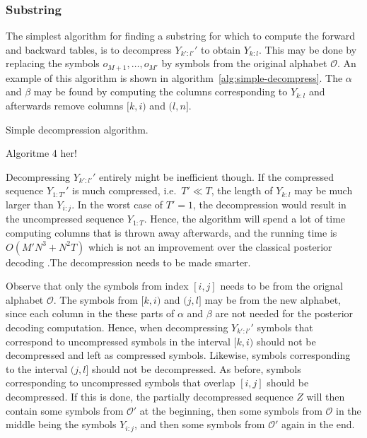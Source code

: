 \subsubsection{Substring}

The simplest algorithm for finding a substring for which to compute the forward
and backward tables, is to decompress $Y_{k':l'}'$ to obtain $Y_{k:l}$. This
may be done by replacing the symbols $o_{M + 1}, \dots, o_{M'}$ by symbols from
the original alphabet $\mathcal{O}$. An example of this algorithm is shown in
algorithm~\ref{alg:simple-decompress}. The $\alpha$ and $\beta$ may be found by
computing the columns corresponding to $Y_{k:l}$ and afterwards remove columns
$[k, i)$ and $(l, n]$.

\begin{algorithm}
  \caption{Simple decompression algorithm.}
  \label{alg:simple-decompress}
  Algoritme 4 her!
\end{algorithm}

Decompressing $Y_{k':l'}'$ entirely might be inefficient though. If the
compressed sequence $Y_{1:T'}'$ is much compressed, i.e.\ $T' \ll T$, the
length of $Y_{k:l}$ may be much larger than $Y_{i:j}$. In the worst case of
$T' = 1$, the decompression would result in the uncompressed sequence
$Y_{1:T}$. Hence, the algorithm will spend a lot of time computing columns that
is thrown away afterwards, and the running time is $O(M' N^3 + N^2 T)$ which is
not an improvement over the classical posterior decoding .The decompression
needs to be made smarter.

Observe that only the symbols from index $[i,j]$ needs to be from the orignal
alphabet $\mathcal{O}$. The symbols from $[k, i)$ and $(j, l]$ may be from the
new alphabet, since each column in the these parts of $\alpha$ and $\beta$ are
not needed for the posterior decoding computation. Hence, when decompressing
$Y_{k':l'}'$ symbols that correspond to uncompressed symbols in the interval
$[k, i)$ should not be decompressed and left as compressed symbols. Likewise,
symbols corresponding to the interval $(j, l]$ should not be decompressed. As
before, symbols corresponding to uncompressed symbols that overlap $[i, j]$
should be decompressed. If this is done, the partially decompressed sequence
$Z$ will then contain some symbols from $\mathcal{O'}$ at the beginning, then
some symbols from $\mathcal{O}$ in the middle being the symbols $Y_{i:j}$, and
then some symbols from $\mathcal{O'}$ again in the end.

